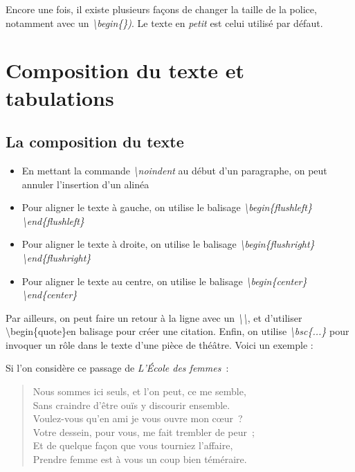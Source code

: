 \documentclass[a4paper, 10pt]{article}
\begin{document}
Encore une fois, il existe plusieurs façons de changer la taille de la police, notamment avec un \textit{\textbackslash begin\{\})}. Le texte en \textit{petit} est celui utilisé par défaut.

\section{Composition du texte et tabulations}
\subsection{La composition du texte}

\begin{itemize}

\item En mettant la commande \textit{\textbackslash noindent} au début d'un paragraphe, on peut annuler l'insertion d'un alinéa
\item Pour aligner le texte à gauche, on utilise le balisage \textit{\textbackslash begin\{flushleft\} \textbackslash end\{flushleft\}}
\item Pour aligner le texte à droite, on utilise le balisage \textit{\textbackslash begin\{flushright\} \textbackslash end\{flushright\}}
\item Pour aligner le texte au centre, on utilise le balisage \textit{\textbackslash begin\{center\} \textbackslash end\{center\}}

\end{itemize}

Par ailleurs, on peut faire un retour à la ligne avec un \textit{\textbackslash \textbackslash}, et d'utiliser {\textbackslash begin\{quote\}}en balisage pour créer une citation. Enfin, on utilise \textit{\textbackslash bsc\{...\}} pour invoquer un rôle dans le texte d'une pièce de théâtre. Voici un exemple : 

Si l'on considère ce passage de \emph{L'\'Ecole des femmes}~:

\small

\begin{center} 
\end{center} 

\begin{quote} 
   Nous sommes ici seuls, et l'on peut, ce me semble, \\
   Sans craindre d'être ouïs y discourir ensemble. \\
   Voulez-vous qu'en ami je vous ouvre mon c\oe{}ur~? \\
   Votre dessein, pour vous, me fait trembler de peur~; \\
   Et de quelque façon que vous tourniez l'affaire, \\
   Prendre femme est à vous un coup bien téméraire.
\end{quote} 
\end{document}
